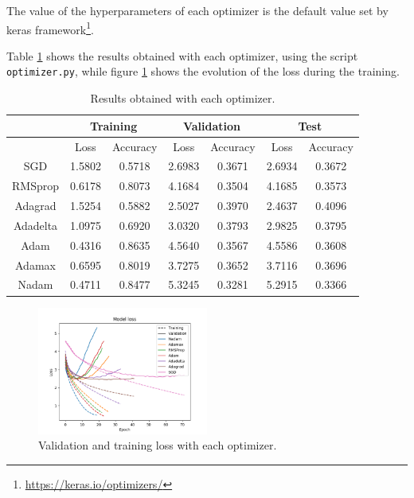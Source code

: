 \documentclass[]{article}
\begin{document}
The value of the hyperparameters of each optimizer is the default value set by keras framework\footnote{\url{https://keras.io/optimizers/}}.

Table \ref{t:opt} shows the results obtained with each optimizer, using the script \texttt{optimizer.py}, while figure \ref{f:opt1} shows the evolution of the loss during the training.

\begin{table}[H]
	\centering
	\label{t:opt}
	\begin{tabular}{@{}ccccccc@{}}
		\toprule
		& \multicolumn{2}{c}{Training} & \multicolumn{2}{c}{Validation} & \multicolumn{2}{c}{Test} \\ \midrule
		& Loss         & Accuracy      & Loss          & Accuracy       & Loss       & Accuracy    \\
		\midrule
		SGD      & 1.5802       & 0.5718        & 2.6983        & 0.3671         & 2.6934     & 0.3672      \\
		RMSprop  & 0.6178       & 0.8073        & 4.1684        & 0.3504         & 4.1685     & 0.3573      \\
		Adagrad  & 1.5254       & 0.5882        & 2.5027        & 0.3970         & 2.4637     & 0.4096      \\
		Adadelta & 1.0975       & 0.6920        & 3.0320        & 0.3793         & 2.9825     & 0.3795      \\
		Adam     & 0.4316       & 0.8635        & 4.5640        & 0.3567         & 4.5586     & 0.3608      \\
		Adamax   & 0.6595       & 0.8019        & 3.7275        & 0.3652         & 3.7116     & 0.3696      \\
		Nadam    & 0.4711       & 0.8477        & 5.3245        & 0.3281         & 5.2915     & 0.3366      \\ \bottomrule
	\end{tabular}
	\caption{Results obtained with each optimizer.}
\end{table}

\begin{figure}[H]
	\centering
	\includegraphics[width=0.5\textwidth]{optimizer_loss}
	\caption{Validation and training loss with each optimizer.}
	\label{f:opt1}
\end{figure}
\end{document}
